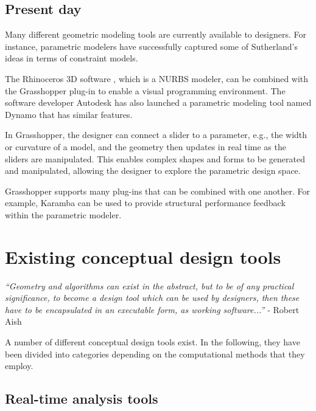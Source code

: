 \subsection{Present day}
Many different geometric modeling tools are currently available to designers. For instance, parametric modelers have successfully captured some of Sutherland’s ideas in terms of constraint models. 

The Rhinoceros 3D software \cite{Rhino}, which is a NURBS  modeler, can be combined with the Grasshopper plug-in \cite{Grasshopper} to enable a visual programming environment. The software developer Autodesk has also launched a parametric modeling tool named Dynamo \cite{Dynamo} that has similar features.

In Grasshopper, the designer can connect a slider to a parameter, e.g., the width or curvature of a model, and the geometry then updates in real time as the sliders are manipulated. This enables complex shapes and forms to be generated and manipulated, allowing the designer to explore the parametric design space. 

Grasshopper supports many plug-ins that can be combined with one another. For example, Karamba \cite{Karamba} can be used to provide structural performance feedback within the parametric modeler. 

\section{Existing conceptual design tools}

\textit{``Geometry and algorithms can exist in the abstract, but to be of any practical significance, to become a design tool which can be used by designers, then these have to be encapsulated in an executable form, as working software...''} - Robert Aish \cite{Shea2005}

A number of different conceptual design tools exist. In the following, they have been divided into categories depending on the computational methods that they employ.

\subsection{Real-time analysis tools}

